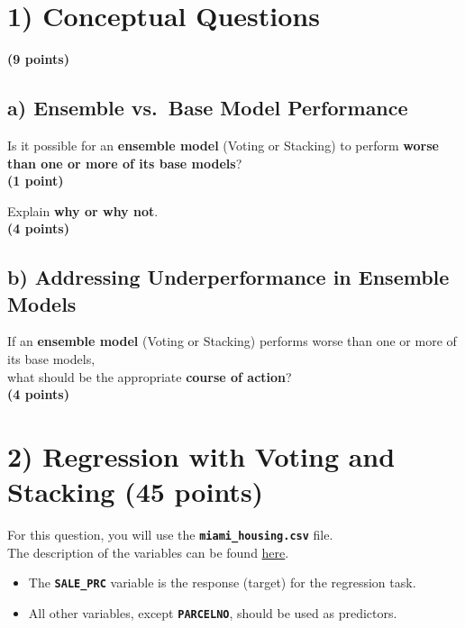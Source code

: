 \documentclass[
  letterpaper,
  DIV=11,
  numbers=noendperiod]{scrreprt}
\providecommand{\tightlist}{%
  \setlength{\itemsep}{0pt}\setlength{\parskip}{0pt}}\usepackage{longtable,booktabs,array}
\begin{document}
\section{1) Conceptual Questions}\label{conceptual-questions}

\textbf{(9 points)}

\subsection{a) Ensemble vs.~Base Model
Performance}\label{a-ensemble-vs.-base-model-performance}

Is it possible for an \textbf{ensemble model} (Voting or Stacking) to
perform \textbf{worse than one or more of its base models}?\\
\textbf{(1 point)}

Explain \textbf{why or why not}.\\
\textbf{(4 points)}

\subsection{b) Addressing Underperformance in Ensemble
Models}\label{b-addressing-underperformance-in-ensemble-models}

If an \textbf{ensemble model} (Voting or Stacking) performs worse than
one or more of its base models,\\
what should be the appropriate \textbf{course of action}?\\
\textbf{(4 points)}

\section{2) Regression with Voting and Stacking (45
points)}\label{regression-with-voting-and-stacking-45-points}

For this question, you will use the \textbf{\texttt{miami\_housing.csv}}
file.\\
The description of the variables can be found
\href{https://www.kaggle.com/datasets/deepcontractor/miami-housing-dataset}{here}.

\begin{itemize}
\tightlist
\item
  The \textbf{\texttt{SALE\_PRC}} variable is the response (target) for
  the regression task.
\item
  All other variables, except \textbf{\texttt{PARCELNO}}, should be used
  as predictors.
\end{itemize}
\end{document}
